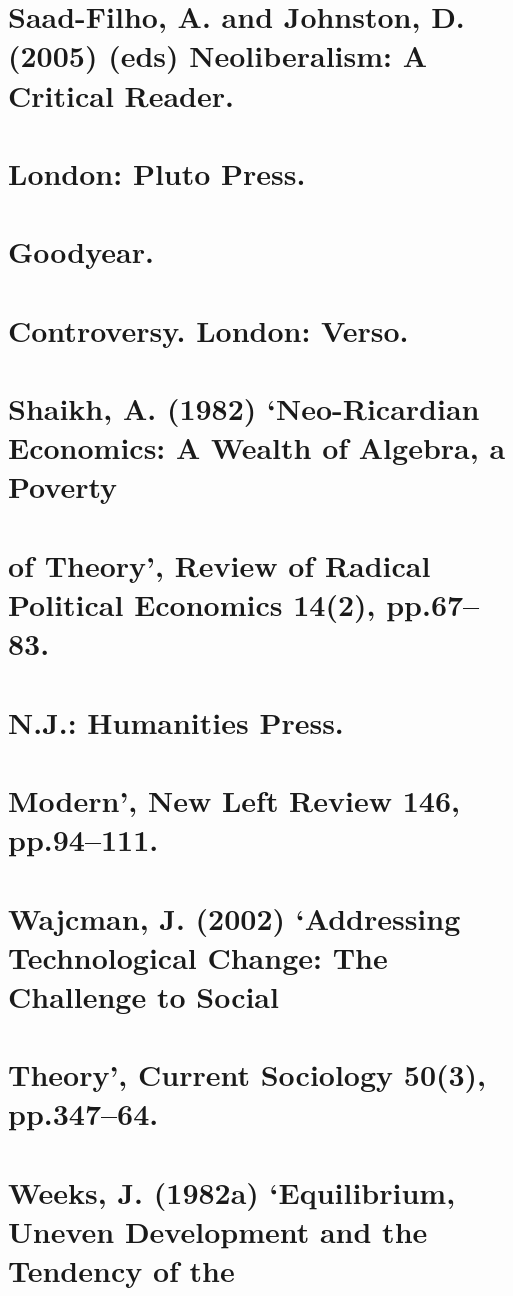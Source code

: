 \section{Saad-Filho, A. and Johnston, D. (2005) (eds) Neoliberalism: A Critical Reader.}


\section{London: Pluto Press.}


\section{Goodyear.}


\section{Controversy. London: Verso.}


\section{Shaikh, A. (1982) ‘Neo-Ricardian Economics: A Wealth of Algebra, a Poverty}


\section{of Theory’, Review of Radical Political Economics 14(2), pp.67–83.}


\section{N.J.: Humanities Press.}


\section{Modern’, New Left Review 146, pp.94–111.}


\section{Wajcman, J. (2002) ‘Addressing Technological Change: The Challenge to Social}


\section{Theory’, Current Sociology 50(3), pp.347–64.}


\section{Weeks, J. (1982a) ‘Equilibrium, Uneven Development and the Tendency of the}


